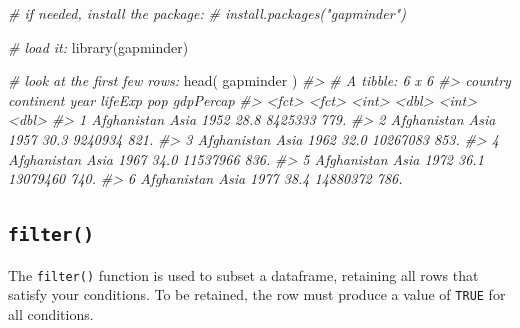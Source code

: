\documentclass[
]{book}
\newenvironment{Shaded}{\begin{snugshade}}{\end{snugshade}}
\newcommand{\CommentTok}[1]{\textcolor[rgb]{0.56,0.35,0.01}{\textit{#1}}}
\newcommand{\FunctionTok}[1]{\textcolor[rgb]{0.00,0.00,0.00}{#1}}
\newcommand{\NormalTok}[1]{#1}
\begin{document}
\begin{Shaded}
\begin{Highlighting}[]
\CommentTok{\# if needed, install the package:}
\CommentTok{\# install.packages("gapminder")}

\CommentTok{\# load it:}
\FunctionTok{library}\NormalTok{(gapminder)}

\CommentTok{\# look at the first few rows:}
\FunctionTok{head}\NormalTok{( gapminder )}
\CommentTok{\#\textgreater{} \# A tibble: 6 x 6}
\CommentTok{\#\textgreater{}   country     continent  year lifeExp      pop gdpPercap}
\CommentTok{\#\textgreater{}   \textless{}fct\textgreater{}       \textless{}fct\textgreater{}     \textless{}int\textgreater{}   \textless{}dbl\textgreater{}    \textless{}int\textgreater{}     \textless{}dbl\textgreater{}}
\CommentTok{\#\textgreater{} 1 Afghanistan Asia       1952    28.8  8425333      779.}
\CommentTok{\#\textgreater{} 2 Afghanistan Asia       1957    30.3  9240934      821.}
\CommentTok{\#\textgreater{} 3 Afghanistan Asia       1962    32.0 10267083      853.}
\CommentTok{\#\textgreater{} 4 Afghanistan Asia       1967    34.0 11537966      836.}
\CommentTok{\#\textgreater{} 5 Afghanistan Asia       1972    36.1 13079460      740.}
\CommentTok{\#\textgreater{} 6 Afghanistan Asia       1977    38.4 14880372      786.}
\end{Highlighting}
\end{Shaded}

\hypertarget{filter}{%
\subsection*{\texorpdfstring{\texttt{filter()}}{filter()}}\label{filter}}

The \texttt{filter()} function is used to subset a dataframe, retaining all rows that satisfy your conditions. To be retained, the row must produce a value of \texttt{TRUE} for all conditions.
\end{document}
